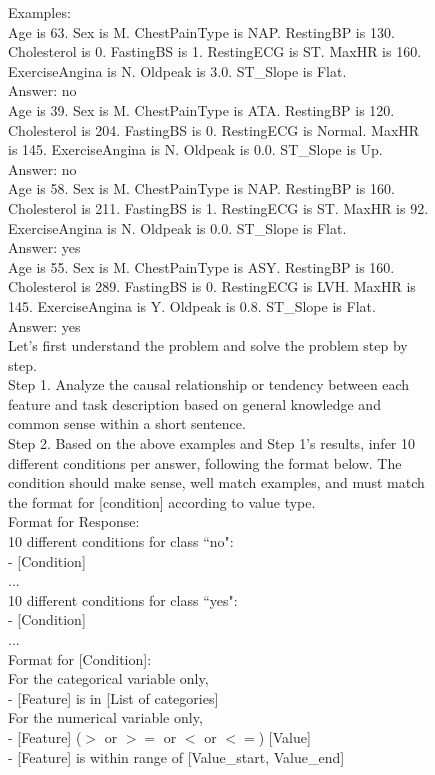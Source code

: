 \documentclass{article}
\theoremstyle{plain}
\theoremstyle{definition}
\theoremstyle{remark}
\begin{document}
\begin{figure}[ht!]
\begin{tcolorbox}[enhanced,attach boxed title to top center={yshift=-3mm,yshifttext=-1mm},
  colback=black!0!white, colframe=black!20!white, colbacktitle=black!10!white, coltitle=blue!20!black ]
{Examples:  \\
Age is 63. Sex is M. ChestPainType is NAP. RestingBP is 130. Cholesterol is 0. FastingBS is 1. RestingECG is ST. MaxHR is 160. ExerciseAngina is N. Oldpeak is 3.0. ST\_Slope is Flat. \\
Answer: no \\
Age is 39. Sex is M. ChestPainType is ATA. RestingBP is 120. Cholesterol is 204. FastingBS is 0. RestingECG is Normal. MaxHR is 145. ExerciseAngina is N. Oldpeak is 0.0. ST\_Slope is Up. \\
Answer: no \\
Age is 58. Sex is M. ChestPainType is NAP. RestingBP is 160. Cholesterol is 211. FastingBS is 1. RestingECG is ST. MaxHR is 92. ExerciseAngina is N. Oldpeak is 0.0. ST\_Slope is Flat. \\ 
Answer: yes\\ 
Age is 55. Sex is M. ChestPainType is ASY. RestingBP is 160. Cholesterol is 289. FastingBS is 0. RestingECG is LVH. MaxHR is 145. ExerciseAngina is Y. Oldpeak is 0.8. ST\_Slope is Flat. \\
Answer: yes \\

Let's first understand the problem and solve the problem step by step. \\
Step 1. Analyze the causal relationship or tendency between each feature and task description based on general knowledge and common sense within a short sentence. \\
Step 2. Based on the above examples and Step 1's results, infer 10 different conditions per answer, following the format below. The condition should make sense, well match examples, and must match the format for [condition] according to value type.\\

Format for Response: \\
10 different conditions for class ``no": \\
- [Condition] \\
... \\ 

10 different conditions for class ``yes": \\
- [Condition] \\
... \\


Format for [Condition]: \\
For the categorical variable only, \\
- [Feature] is in [List of categories]\\
For the numerical variable only,\\
- [Feature] ($>$ or $>=$ or $<$ or $<=$) [Value]\\
- [Feature] is within range of [Value\_start, Value\_end]\\

}
\end{tcolorbox}
\end{figure}
\end{document}
